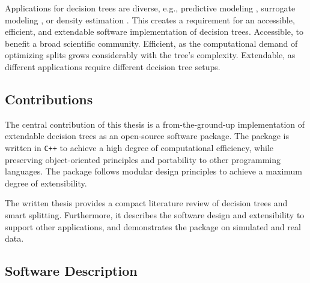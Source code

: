 \documentclass[a4paper, 11pt]{article}
\begin{document}
\par
Applications for decision trees are diverse, e.g., predictive modeling \cite{hastie_elemstatlearn}, surrogate modeling \cite{schaaf_surrogate_tree}, or density estimation \cite{ram_density_estimation_tree}. This creates a requirement for an accessible, efficient, and extendable software implementation of decision trees. Accessible, to benefit a broad scientific community. Efficient, as the computational demand of optimizing splits grows considerably with the tree's complexity. Extendable, as different applications require different decision tree setups.
\par

\subsection{Contributions} The central contribution of this thesis is a from-the-ground-up implementation of extendable decision trees as an open-source software package. The package is written in \texttt{C++} to achieve a high degree of computational efficiency, while preserving object-oriented principles and portability to other programming languages. The package follows modular design principles to achieve a maximum degree of extensibility.
\par
The written thesis provides a compact literature review of decision trees and smart splitting. Furthermore, it describes the software design and extensibility to support other applications, and demonstrates the package on simulated and real data.

\subsection{Software Description}
\end{document}
